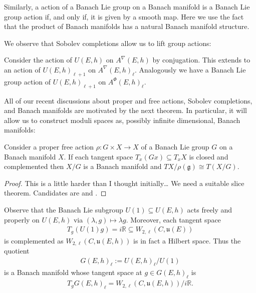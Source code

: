 \documentclass[12pt]{ociamthesis}  %
\begin{document}
Similarly, a action of a Banach Lie group on a Banach manifold
is a Banach Lie group action if, and only if, it is given by a
smooth map. Here we use the fact that the product of Banach manifolds
has a natural Banach manifold structure.

We observe that Sobolev completions allow us to lift group
actions:

\begin{example}
  Consider the action of $U(E,h)$ on $A^\nabla(E,h)$
  by conjugation. This extends to an action of $U(E,h)_{\ell+1}$
  on $A^\nabla(E,h)_\ell$.
  \missingproof
  Analogously we have a Banach Lie group action of $U(E,h)_{\ell+1}$
  on $A^\Phi (E,h)_\ell$.
\end{example}


All of our recent discussions about proper and free actions, Sobolev
completions, and Banach manifolds are motivated by the next theorem.
In particular, it will allow us to construct moduli spaces as, possibly
infinite dimensional, Banach manifolds:

\begin{theorem}\label{thm:banach_quotient}
  Consider a proper free action $\rho : G\times X\to X$ of a Banach
  Lie group $G$ on a Banach manifold $X$. If each tangent space
  $T_x(Gx) \subseteq T_x X$ is closed and complemented then
  $X/G$ is a Banach manifold and $TX/\rho(\mathfrak g) \cong T(X/G)$.
  \begin{proof}
    This is a little harder than I thought initially\dots
    We need a suitable slice theorem. Candidates are \cite[Theorem 3.28]{diez2019}
    and \cite[Theorem 5.2.6]{palais1992}.
    \missingproof
  \end{proof}
\end{theorem}

\begin{example}
  Observe that the Banach Lie subgroup $U(1)\subseteq U(E,h)$ acts freely and properly
  on $U(E,h)$ via $(\lambda,g)\mapsto \lambda g$. Moreover, each tangent space
  \begin{align*}
    T_g(U(1)g) =
    i\mathbb{R} \subseteq W_{2,\ell}(C,\mathfrak u(E))
  \end{align*}
  is complemented as $W_{2,\ell}(C,\mathfrak u(E,h))$ is in fact a Hilbert space.
  Thus the quotient
  \begin{align*}
    G(E,h)_{\ell} := U(E,h)_\ell / U(1)
  \end{align*}
  is a Banach manifold whose tangent space at $g\in G(E,h)_\ell$ is
  \begin{align*}
    T_g G(E,h)_\ell = W_{2,\ell}(C,\mathfrak u(E,h))/i\mathbb{R}.
  \end{align*}
\end{example}
\end{document}
